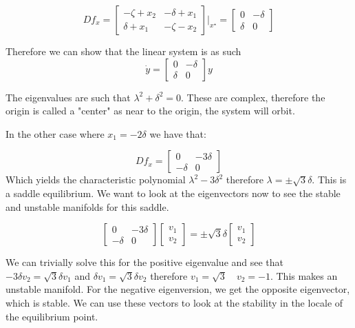 \documentclass[11pt]{article}
\begin{document}
\begin{equation}
Df_x = 
\begin{bmatrix}
-\zeta + x_2 & -\delta +x_1 \\
\delta + x_1 & -\zeta -x_2	
\end{bmatrix}
\bigg\lvert_{x^\star} = 	
\begin{bmatrix}
0 & -\delta \\
\delta & 0
\end{bmatrix}
\end{equation}

Therefore we can show that the linear system is as such 
\begin{equation}
\dot{y} = 
\begin{bmatrix}
0 & -\delta \\
\delta & 0
\end{bmatrix} y
\end{equation}

The eigenvalues are such that $\lambda^2 + \delta^2 = 0$. These are complex, therefore the origin is called a "center" as near to the origin, the system will orbit.

In the other case where $x_1 = -2\delta$ we have that:

\begin{equation}
Df_x = 
\begin{bmatrix}
0 & -3\delta \\
-\delta & 0
\end{bmatrix}
\end{equation}
Which yields the characteristic polynomial $\lambda^2 - 3\delta^2$ therefore $\lambda = \pm \sqrt{3} \delta$. This is a saddle equilibrium. We want to look at the eigenvectors now to see the stable and unstable manifolds for this saddle. 

\begin{equation}
\begin{bmatrix}
0 & -3\delta \\
-\delta & 0
\end{bmatrix}
\begin{bmatrix}
v_1 \\
v_2
\end{bmatrix} = 
\pm \sqrt{3}\delta
\begin{bmatrix}
v_1 \\
v_2
\end{bmatrix}
\end{equation}

We can trivially solve this for the positive eigenvalue and see that $-3\delta v_2 = \sqrt{3}\delta v_1$ and $\delta v_1 = \sqrt{3}\delta v_2$ therefore $v_1 = \sqrt{3} \quad v_2 = -1$. This makes an unstable manifold. For the negative eigenversion, we get the opposite eigenvector, which is stable. We can use these vectors to look at the stability in the locale of the equilibrium point.
\end{document}
